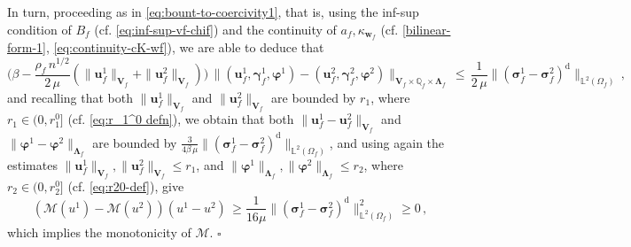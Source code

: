 \documentclass[11pt]{article}
\numberwithin{equation}{section}
\newcommand{\bgamma}{{\boldsymbol\gamma}}
\newcommand{\bLambda}{{\boldsymbol\Lambda}}
\newcommand{\bsi}{{\boldsymbol\sigma}}
\newcommand{\bvarphi}{{\boldsymbol\varphi}}
\newcommand{\btau}{{\boldsymbol\tau}}
\newcommand{\bw}{{\mathbf{w}}}
\newcommand{\bu}{\mathbf{u}}
\newcommand{\bn}{{\mathbf{n}}}
\newcommand{\0}{{\mathbf{0}}}
\def\bV{\mathbf{V}}
\newcommand\bbQ{\mathbb{Q}}
\newcommand\bbX{\mathbb{X}}
\newcommand\bbL{\mathbb{L}}
\newcommand{\cB}{\mathcal{B}}
\newcommand{\cM}{\mathcal{M}}
\def\rd{\mathrm{d}}
\def\bdiv{\mathbf{div}}
\def\pil{\left<}
\def\pir{\right>}
\newenvironment{proof}{\noindent{\it Proof.}}{\hfill$\square$}
\numberwithin{equation}{section}
\begin{document}
\begin{proof}
In turn, proceeding as in \eqref{eq:bount-to-coercivity1}, that is, using the inf-sup condition of $B_f$ (cf. \eqref{eq:inf-sup-vf-chif}) and the continuity of $a_f, \kappa_{\bw_f}$ (cf. \eqref{bilinear-form-1}, \eqref{eq:continuity-cK-wf}), we are able to deduce that 
\begin{equation*}%
\big(\beta - \frac{\rho_f\,n^{1/2}}{2\,\mu}(\|\bu^1_f\|_{\bV_f}+\|\bu^2_f\|_{\bV_f})\big)\,\|(\bu_f^1, \bgamma_f^1, \bvarphi^1)-(\bu_f^2, \bgamma_f^2, \bvarphi^2) \|_{\bV_f\times \bbQ_f\times \bLambda_f} \,\leq\, \frac{1}{2\,\mu} \|(\bsi^1_f - \bsi^2_f)^\rd\|_{\bbL^2(\Omega_f)}\,,
\end{equation*}
and recalling that both $\|\bu_f^1\|_{\bV_f} $ and $\|\bu^2_f\|_{\bV_f}$ are bounded by $r_1$, where $r_1\in (0,r_1^0]$ (cf. \eqref{eq:r_1^0 defn}), we obtain that both $\|\bu_f^1 - \bu_f^2\|_{\bV_f}$ and $\|\bvarphi^1-\bvarphi^2\|_{\bLambda_f}$ are bounded by $\frac{3}{4\beta\,\mu} \|(\bsi^1_f - \bsi^2_f)^\rd\|_{\bbL^2(\Omega_f)}$, and using again the estimates $\|\bu_f^1\|_{\bV_f}, \|\bu_f^2\|_{\bV_f} \leq r_1$, and $\|\bvarphi^1\|_{\bLambda_f}, \|\bvarphi^2\|_{\bLambda_f} \leq r_2$, where $r_2\in (0,r_2^0]$ (cf. \eqref{eq:r20-def}), give
\begin{equation}\label{eq:mono u bound2}
(\cM(u^1)-\cM(u^2))(u^1-u^2)
\,\geq \frac{1}{16\mu}\|(\bsi^1_f - \bsi^2_f)^\rd\|^2_{\bbL^2(\Omega_f)}\geq 0\,,
\end{equation}
which implies the monotonicity of $\cM$.
\end{proof}
\end{document}
